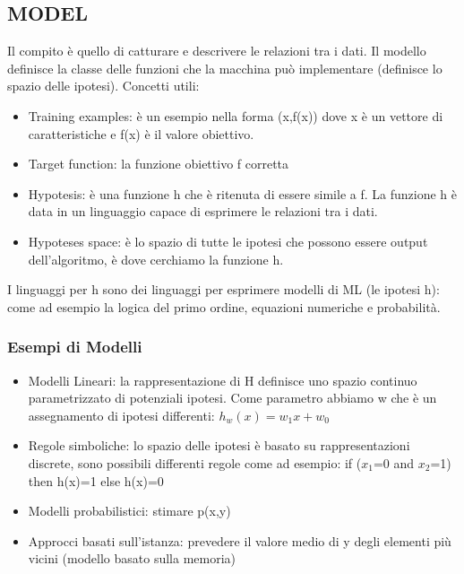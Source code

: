 \documentclass{article}
\begin{document}
\subsection{MODEL}
Il compito è quello di catturare e descrivere le relazioni tra i dati. Il modello definisce la classe delle funzioni che la macchina può implementare (definisce lo spazio delle ipotesi). \newline
Concetti utili: 
\begin{itemize}
    \item Training examples: è un esempio nella forma (x,f(x)) dove x è un vettore di caratteristiche e f(x) è il valore obiettivo.
    \item Target function: la funzione obiettivo f corretta
    \item Hypotesis: è una funzione h che è ritenuta di essere simile a f. La funzione h è data in un linguaggio capace di esprimere le relazioni tra i dati.
    \item Hypoteses space: è lo spazio di tutte le ipotesi che possono essere output dell'algoritmo, è dove cerchiamo la funzione h. 
\end{itemize}
I linguaggi per h sono dei linguaggi per esprimere modelli di ML (le ipotesi h): come ad esempio la logica del primo ordine, equazioni numeriche e probabilità. \newline
\subsubsection{Esempi di Modelli}
\begin{itemize}
    \item Modelli Lineari: la rappresentazione di H definisce uno spazio continuo parametrizzato di potenziali ipotesi. Come parametro abbiamo w che è un assegnamento di ipotesi differenti: $h_w(x)=w_1x+w_0$
    \item Regole simboliche: lo spazio delle ipotesi è basato su rappresentazioni discrete, sono possibili differenti regole come ad esempio: if ($x_1$=0 and $x_2$=1) then h(x)=1 else h(x)=0
    \item Modelli probabilistici: stimare p(x,y)
    \item Approcci basati sull'istanza: prevedere il valore medio di y degli elementi più vicini (modello basato sulla memoria)
\end{itemize}
\end{document}
